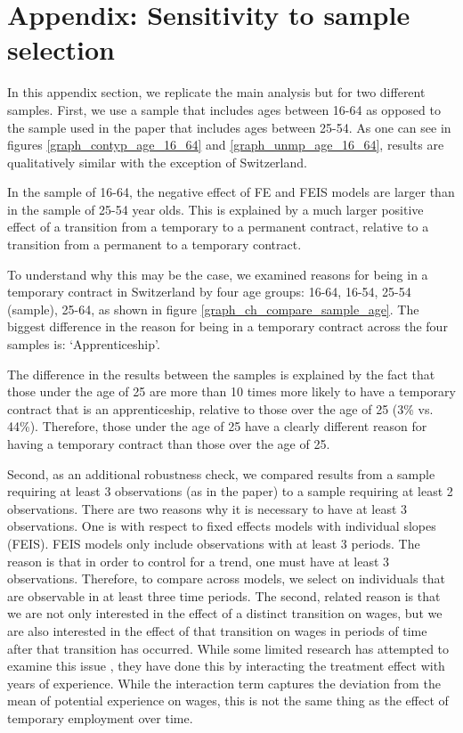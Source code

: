 \section{Appendix: Sensitivity to sample selection}\label{sec:sensitivity_sample}
\setcounter{table}{0}
\setcounter{figure}{0}
\renewcommand*\thetable{\Alph{section}.\arabic{table}}
\renewcommand*\thefigure{\Alph{section}.\arabic{figure}}
\renewcommand{\theHfigure}{\Alph{section}.\arabic{table}}
\renewcommand{\theHtable}{\Alph{section}.\arabic{figure}}

In this appendix section, we replicate the main analysis but for two different samples.  First, we use a sample that includes ages between 16-64 as opposed to the sample used in the paper that includes ages between 25-54.  As one can see in figures \ref{graph_contyp_age_16_64} and \ref{graph_unmp_age_16_64}, results are qualitatively similar with the exception of Switzerland.  

In the sample of 16-64, the negative effect of FE and FEIS models are larger than in the sample of 25-54 year olds.  This is explained by a much larger positive effect of a transition from a temporary to a permanent contract, relative to a transition from a permanent to a temporary contract.  

To understand why this may be the case, we examined reasons for being in a temporary contract in Switzerland by four age groups: 16-64, 16-54, 25-54 (sample), 25-64, as shown in figure \ref{graph_ch_compare_sample_age}.  The biggest difference in the reason for being in a temporary contract across the four samples is: `Apprenticeship'.

The difference in the results between the samples is explained by the fact that those under the age of 25 are more than 10 times more likely to have a temporary contract that is an apprenticeship, relative to those over the age of 25 (3\% vs. 44\%).  Therefore, those under the age of 25 have a clearly different reason for having a temporary contract than those over the age of 25.  

Second, as an additional robustness check, we compared results from a sample requiring at least 3 observations (as in the paper) to a sample requiring at least 2 observations.  There are two reasons why it is necessary to have at least 3 observations.  One is with respect to fixed effects models with individual slopes (FEIS).  FEIS models only include observations with at least 3 periods.  The reason is that in order to control for a trend, one must have at least 3 observations.  Therefore, to compare across models, we select on individuals that are observable in at least three time periods.  The second, related reason is that we are not only interested in the effect of a distinct transition on wages, but we are also interested in the effect of that transition on wages in periods of time after that transition has occurred.  While some limited research has attempted to examine this issue \citep{booth_temporary_2002,mooi-reci_casual_2017}, they have done this by interacting the treatment effect with years of experience.  While the interaction term captures the deviation from the mean of potential experience on wages, this is not the same thing as the effect of temporary employment over time.  


